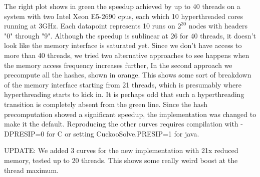 \documentclass[11pt, oneside]{article}
\newcommand{\hash}{{\rm siphash}}
\begin{document}
The right plot shows in green the speedup achieved by up to 40 threads on a system with two Intel Xeon
E5-2690 cpus, each which 10 hyperthreaded cores running at 3GHz.
Each datapoint represents 10 runs on $2^{30}$ nodes with headers "0" through "9".
Although the speedup is sublinear at 26 for 40 threads, it doesn't look like the memory interface
is saturated yet. Since we don't have access to more than 40 threads, we tried two alternative
approaches to see happens when the memory access frequency increases further,
In the second approach we precompute all the hashes, shown in orange.
This shows some sort of breakdown of the memory interface starting from 21 threads,
which is presumably where hyperthreading starts to kick in.
It is perhaps odd that such a hyperthreading transition is completely absent from the green line.
Since the hash precomputation showed a significant speedup, the implementation was changed
to make it the default.
Reproducing the other curves requires compilation with -DPRESIP=0 for C or setting CuckooSolve.PRESIP=1 for java.

UPDATE: We added 3 curves for the new implementation with 21x reduced memory, tested up to 20 threads.
This shows some really weird boost at the thread maximum.
\end{document}
